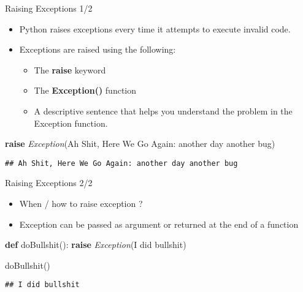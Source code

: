\documentclass[
  8pt,
  ignorenonframetext,
]{beamer}
\newenvironment{Shaded}{\begin{snugshade}}{\end{snugshade}}
\newcommand{\ControlFlowTok}[1]{\textcolor[rgb]{0.13,0.29,0.53}{\textbf{#1}}}
\newcommand{\KeywordTok}[1]{\textcolor[rgb]{0.13,0.29,0.53}{\textbf{#1}}}
\newcommand{\NormalTok}[1]{#1}
\newcommand{\PreprocessorTok}[1]{\textcolor[rgb]{0.56,0.35,0.01}{\textit{#1}}}
\newcommand{\StringTok}[1]{\textcolor[rgb]{0.31,0.60,0.02}{#1}}
\providecommand{\tightlist}{%
  \setlength{\itemsep}{0pt}\setlength{\parskip}{0pt}}
\begin{document}
\begin{frame}[fragile]{Raising Exceptions 1/2}
\protect\hypertarget{raising-exceptions-12}{}
\begin{itemize}
\item
  Python raises exceptions every time it attempts to execute invalid
  code.
\item
  Exceptions are raised using the following:

  \begin{itemize}
  \tightlist
  \item
    The \textbf{raise} keyword
  \item
    The \textbf{Exception()} function
  \item
    A descriptive sentence that helps you understand the problem in the
    Exception function.
  \end{itemize}
\end{itemize}

\begin{Shaded}
\begin{Highlighting}[]
\ControlFlowTok{raise} \PreprocessorTok{Exception}\NormalTok{(}\StringTok{\textquotesingle{}Ah Shit, Here We Go Again: another day another bug\textquotesingle{}}\NormalTok{)}
\end{Highlighting}
\end{Shaded}

\begin{verbatim}
## Ah Shit, Here We Go Again: another day another bug
\end{verbatim}
\end{frame}

\begin{frame}[fragile]{Raising Exceptions 2/2}
\protect\hypertarget{raising-exceptions-22}{}
\begin{itemize}
\item
  When / how to raise exception ?
\item
  Exception can be passed as argument or returned at the end of a
  function
\end{itemize}

\begin{Shaded}
\begin{Highlighting}[]
\KeywordTok{def}\NormalTok{ doBullshit():}
  \ControlFlowTok{raise} \PreprocessorTok{Exception}\NormalTok{(}\StringTok{\textquotesingle{}I did bullshit\textquotesingle{}}\NormalTok{)}

\NormalTok{doBullshit()}
\end{Highlighting}
\end{Shaded}

\begin{verbatim}
## I did bullshit
\end{verbatim}
\end{frame}
\end{document}

